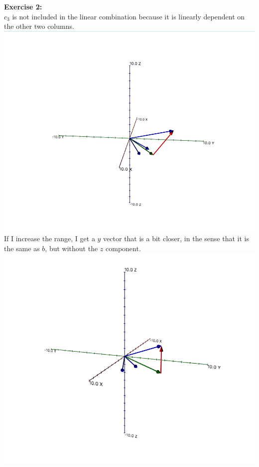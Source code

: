 \documentclass[10pt]{article}
\begin{document}
	\textbf{\large Exercise 2:}\\
	$c_3$ is not included in the linear combination because it is linearly dependent on the other two columns. \\
	\includegraphics[scale=0.2]{module7_exercise2_1}\\
	If I increase the range, I get a $y$ vector that is a bit closer, in the sense that it is the same as $b$, but without the $z$ component. \\
	\includegraphics[scale=0.2]{module7_exercise2_new_range}
	\\
	
\end{document}
